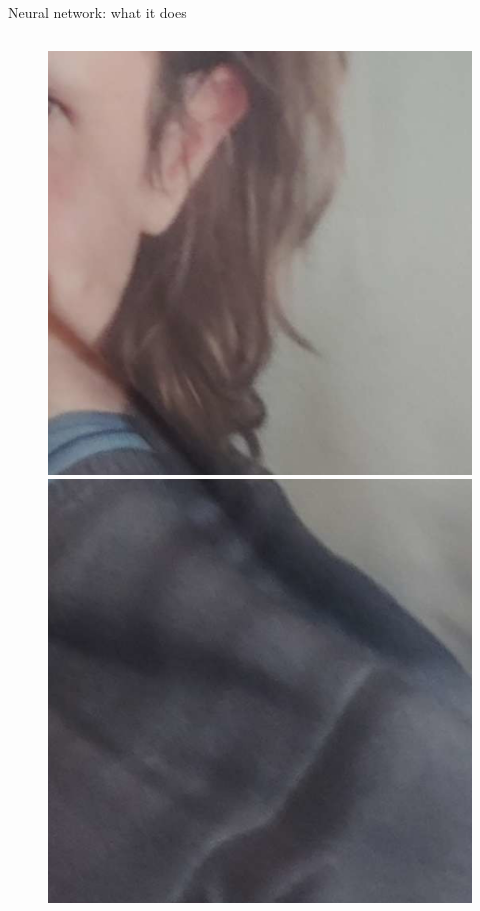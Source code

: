 \documentclass{beamer}
\begin{document}
\begin{frame}{Neural network: what it does}
\begin{columns}
\begin{column}{0.05\textwidth}
\begin{figure}
                \includegraphics[width=\linewidth]{distorted/distorted-2-1}
                \includegraphics[width=\linewidth]{distorted/distorted-2-2}

\end{figure}
\end{column}
\end{columns}
\end{frame}
\end{document}
